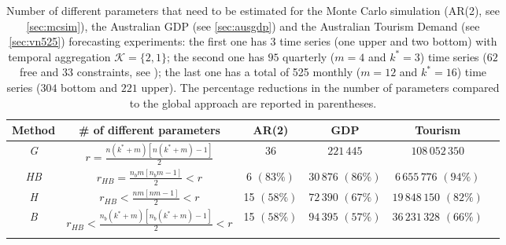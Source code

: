 \documentclass[12pt]{article}
\theoremstyle{definition}
\begin{document}
\begin{table}[!t]
	\centering
	\begingroup
	\setlength\tabcolsep{6pt}
	\begin{tabular}{cccccc}
		\toprule
		\textbf{Method}            & \textbf{\# of different parameters}                             & \textbf{AR(2)} & \textbf{GDP} & \textbf{Tourism}\\
		\midrule
		\addlinespace[0.25cm]
		\textit{G}                          & $r = \displaystyle\frac{n(k^\ast+m)[n(k^\ast+m)-1]}{2}$         & 36             & $221\,445$          & $108\,052\,350$ \\
		\addlinespace[0.25cm]
		\textit{HB} & $r_{HB} = \displaystyle\frac{n_bm[n_bm-1]}{2}<r$       & \makecell{6 \\[-0.1cm] {\footnotesize$(83\%)$}}             & \makecell{$30\,876$ \\[-0.1cm] {\footnotesize$(86\%)$}}           & \makecell{$6\,655\,776$ \\[-0.1cm] {\footnotesize$(94\%)$}}  \\
		\addlinespace[0.25cm]
		\textit{H}               & $r_{HB}<\displaystyle\frac{nm[nm-1]}{2}<r$ & \makecell{15 \\[-0.1cm] {\footnotesize$(58\%)$}}             & \makecell{$72\,390$ \\[-0.1cm] {\footnotesize$(67\%)$}}           & \makecell{$19\,848\,150$ \\[-0.1cm] {\footnotesize$(82\%)$}}\\
		\addlinespace[0.25cm]
		\textit{B}              & $r_{HB}<\displaystyle\frac{n_b(k^\ast+m)[n_b(k^\ast+m)-1]}{2}<r$ & \makecell{15 \\[-0.1cm] {\footnotesize$(58\%)$}}             & \makecell{$94\,395$ \\[-0.1cm] {\footnotesize$(57\%)$}}           & \makecell{$36\,231\,328$ \\[-0.1cm] {\footnotesize$(66\%)$}}\\
		\addlinespace[0.25cm]
		\bottomrule
	\end{tabular}
	\endgroup
	\caption{Number of different parameters that need to be estimated for the Monte Carlo simulation (AR(2), see \autoref{sec:mcsim}), the Australian GDP (see \autoref{sec:ausgdp}) and the Australian Tourism Demand (see \autoref{sec:vn525}) forecasting experiments: the first one has $3$ time series (one upper and two bottom) with temporal aggregation $\mathcal{K} = \{2, 1\}$; the second one has $95$ quarterly ($m = 4$ and $k^\ast = 3$) time series ($62$ free and $33$ constraints, see \citealp{giro2022}); the last one has a total of 525 monthly ($m = 12$ and $k^\ast = 16$) time series ($304$ bottom and $221$ upper). The percentage reductions in the number of parameters compared to the global approach are reported in parentheses.}
	\label{tab:num_param}
\end{table}
\end{document}
